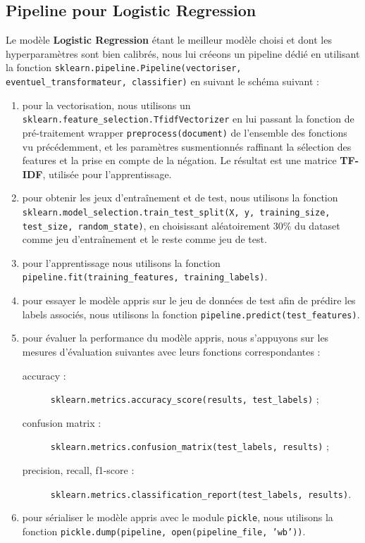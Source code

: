 \documentclass[12pt,a4paper]{report}
\theoremstyle{definition}
\begin{document}
\subsection{Pipeline pour Logistic Regression}
Le modèle \textbf{Logistic Regression} étant le meilleur modèle choisi et dont les hyperparamètres sont bien calibrés, nous lui créeons un pipeline dédié en utilisant la fonction \texttt{sklearn.pipeline.Pipeline(vectoriser, eventuel\_transformateur, classifier)} en suivant le schéma suivant :
\begin{enumerate}
  \item pour la vectorisation, nous utilisons un \texttt{sklearn.feature\_selection.TfidfVectorizer} en lui passant la fonction de pré-traitement wrapper \texttt{preprocess(document)} de l'ensemble des fonctions vu précédemment, et les paramètres susmentionnés raffinant la sélection des features et la prise en compte de la négation. Le résultat est une matrice \textbf{TF-IDF}, utilisée pour l'apprentissage.
  \item pour obtenir les jeux d'entraînement et de test, nous utilisons la fonction \texttt{sklearn.model\_selection.train\_test\_split(X, y, training\_size, test\_size, random\_state)}, en choisissant aléatoirement 30\% du dataset comme jeu d'entraînement et le reste comme jeu de test.
  \item pour l'apprentissage nous utilisons la fonction \texttt{pipeline.fit(training\_features, training\_labels)}.
  \item pour essayer le modèle appris sur le jeu de données de test afin de prédire les labels associés, nous utilisons la fonction \texttt{pipeline.predict(test\_features)}.
  \item pour évaluer la performance du modèle appris, nous s'appuyons sur les mesures d'évaluation suivantes avec leurs fonctions correspondantes :
  \begin{description}
    \item [accuracy :] \texttt{sklearn.metrics.accuracy\_score(results, test\_labels)} ;
    \item [confusion matrix :] \texttt{sklearn.metrics.confusion\_matrix(test\_labels, results)} ;
    \item [precision, recall, f1-score :] \texttt{sklearn.metrics.classification\_report(test\_labels, results)}.
  \end{description}
  \item pour sérialiser le modèle appris avec le module \texttt{pickle}, nous utilisons la fonction \texttt{pickle.dump(pipeline, open(pipeline\_file, 'wb'))}.
\end{enumerate}
\end{document}
